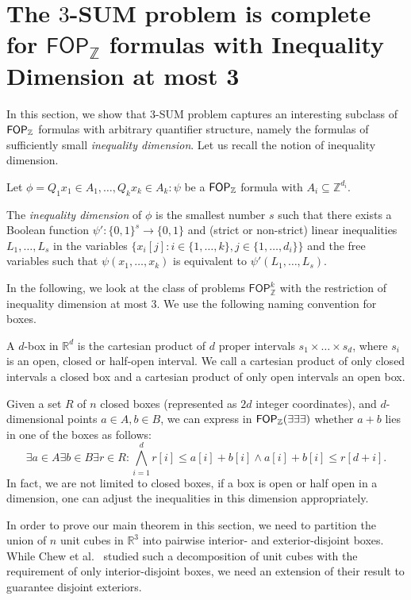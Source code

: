 \section{The $3$-SUM problem is complete for $\mathsf{FOP}_{\mathbb{Z}}$ formulas with Inequality Dimension at most 3}\label{sec:IneqDimension}

In this section, we show that $3$-SUM problem captures an interesting subclass of $\mathsf{FOP}_{\mathbb{Z}}$ formulas with arbitrary quantifier structure, namely the formulas of sufficiently small \emph{inequality dimension}.  Let us recall the notion of inequality dimension.
\begin{definition}
  Let $\phi = Q_1 x_1\in A_1, \dots, Q_k x_k\in A_k: \psi$ be a $\mathsf{FOP}_{\mathbb{Z}}$ formula with $A_i\subseteq \mathbb{Z}^{d_i}$.
  
  The \emph{inequality dimension} of $\phi$ is the smallest number $s$ such that there exists a Boolean function $\psi' :\{0,1\}^s \to \{0,1\}$ and (strict or non-strict)
  linear inequalities $L_1, \dots, L_s$ in the variables $\{x_i[j] : i\in \{1,\dots,k\} ,j\in \{1,\dots,d_i\} \}$ and 
  the free variables such that $\psi(x_1,\dots, x_k)$ is equivalent to $\psi'(L_1,\dots, L_s)$.  
\end{definition}
In the following, we look at the class of problems $\mathsf{FOP}_{\mathbb{Z}}^k$ with the restriction of 
inequality dimension at most $3$.
We use the following naming convention for boxes.
\begin{definition}
  A $d$-box in $\mathbb{R}^d$ is the cartesian product of $d$ proper intervals $s_1 \times \dots \times s_d$,
  where $s_i$ is an open, closed or half-open interval. We call a cartesian product of only closed intervals a closed box and
  a cartesian product of only open intervals an open box.
  \end{definition}
  Given a set $R$ of $n$ closed boxes (represented as $2d$ integer coordinates), and $d$-dimensional points $a \in A ,b \in B$, we can express in $\mathsf{FOP}_{\mathbb{Z}}(\exists \exists \exists)$ whether $a+b$ lies in one of the boxes as follows:
  $$ \exists a \in A \exists b \in B \exists r \in R: \bigwedge_{i=1}^{d} r[i] \leq a[i]+b[i] \land a[i]+b[i]  \leq r[d+i]. $$ 
  In fact, we are not limited to closed boxes, if a box is open or half open in a dimension, one can adjust the inequalities in this dimension appropriately.

In order to prove our main theorem in this section, we need to partition the union of $n$ unit cubes in $\mathbb{R}^3$ into pairwise interior- and exterior-disjoint boxes.
While Chew et al.~\cite{DBLP:journals/dcg/ChewDEK99} studied such a decomposition of unit cubes  with the requirement of only interior-disjoint boxes, we need an extension of their result to guarantee disjoint exteriors.

